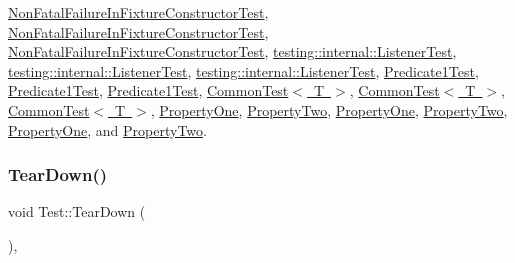 \mbox{\hyperlink{class_non_fatal_failure_in_fixture_constructor_test_ab76d79c346d9a378d625fde5739e8ad6}{Non\+Fatal\+Failure\+In\+Fixture\+Constructor\+Test}}, \mbox{\hyperlink{class_non_fatal_failure_in_fixture_constructor_test_ad5d87bdc012dc66c008e7891008eb6a8}{Non\+Fatal\+Failure\+In\+Fixture\+Constructor\+Test}}, \mbox{\hyperlink{class_non_fatal_failure_in_fixture_constructor_test_ad5d87bdc012dc66c008e7891008eb6a8}{Non\+Fatal\+Failure\+In\+Fixture\+Constructor\+Test}}, \mbox{\hyperlink{classtesting_1_1internal_1_1_listener_test_a733f61300772e432a6a3ec7837c9f331}{testing\+::internal\+::\+Listener\+Test}}, \mbox{\hyperlink{classtesting_1_1internal_1_1_listener_test_a733f61300772e432a6a3ec7837c9f331}{testing\+::internal\+::\+Listener\+Test}}, \mbox{\hyperlink{classtesting_1_1internal_1_1_listener_test_ad112535025d668e3ea14e71d8741c810}{testing\+::internal\+::\+Listener\+Test}}, \mbox{\hyperlink{class_predicate1_test_aacedc6281afabd551ae2e67777016f3d}{Predicate1\+Test}}, \mbox{\hyperlink{class_predicate1_test_aacedc6281afabd551ae2e67777016f3d}{Predicate1\+Test}}, \mbox{\hyperlink{class_predicate1_test_ad2974af5c6abc508847c3a9912b24a90}{Predicate1\+Test}}, \mbox{\hyperlink{class_common_test_a5e851b64ff1f73cb79b4dbd1d39fd075}{Common\+Test$<$ T $>$}}, \mbox{\hyperlink{class_common_test_a5e851b64ff1f73cb79b4dbd1d39fd075}{Common\+Test$<$ T $>$}}, \mbox{\hyperlink{class_common_test_aeae195c2cefa956c6ae5be1226e6ecd8}{Common\+Test$<$ T $>$}}, \mbox{\hyperlink{class_property_one_a3ed895113848403d5ea27f52a1bb0545}{Property\+One}}, \mbox{\hyperlink{class_property_two_aa4ffb2b9dddeba69f0f9baf133f06ef2}{Property\+Two}}, \mbox{\hyperlink{class_property_one_a0a9a054682c28e32d6b3007e966a1aaf}{Property\+One}}, \mbox{\hyperlink{class_property_two_a8c2b36ef29249c5654f13bf8f504236a}{Property\+Two}}, \mbox{\hyperlink{class_property_one_a0a9a054682c28e32d6b3007e966a1aaf}{Property\+One}}, and \mbox{\hyperlink{class_property_two_a8c2b36ef29249c5654f13bf8f504236a}{Property\+Two}}.

\mbox{\label{classtesting_1_1_test_a5f0ab439802cbe0ef7552f1a9f791923}} 
\subsubsection{\texorpdfstring{TearDown()}{TearDown()}\hspace{0.1cm}{\footnotesize\ttfamily [2/3]}}
{\footnotesize\ttfamily void Test\+::\+Tear\+Down (\begin{DoxyParamCaption}{ }\end{DoxyParamCaption})\hspace{0.3cm}{\ttfamily [protected]}, {\ttfamily [virtual]}}



